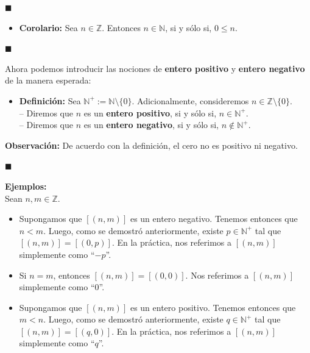 \documentclass[10 pt]{article}
\begin{document}
\begin{flushright}
    $\blacksquare$
\end{flushright}

\begin{itemize}
    \item \Large{\textbf{Corolario:} Sea $n \in \mathbb Z$. Entonces $n \in \mathbb N$, si y sólo si, $0 \leq n$.} \\
\end{itemize}

\begin{flushright}
    $\blacksquare$
\end{flushright}

\Large{Ahora podemos introducir las nociones de \textbf{entero positivo} y \textbf{entero negativo} de la manera esperada:} \\

\begin{itemize}
    \item \Large{\textbf{Definición:} Sea $\mathbb N^+:=\mathbb N \setminus \{0\}$. Adicionalmente, consideremos $n \in \mathbb Z \setminus \{0\}$. \\

    -- Diremos que $n$ es un \textbf{entero positivo}, si y sólo si, $n \in \mathbb N^+$. \\

    -- Diremos que $n$ es un \textbf{entero negativo}, si y sólo si, $n \notin \mathbb N^+$.} \\
\end{itemize}

\Large{\textbf{Observación:} De acuerdo con la definición, el cero no es positivo ni negativo.} \\

\begin{flushright}
    $\blacksquare$
\end{flushright}

\Large{\textbf{Ejemplos:}} \\

\Large{Sean $n,m \in \mathbb Z$.} \\

\begin{itemize}
    \item \Large{Supongamos que $[(n,m)]$ es un entero negativo. Tenemos entonces que $n<m$. Luego, como se demostró anteriormente, existe $p \in \mathbb N^+$ tal que $[(n,m)]=[(0,p)]$. En la práctica, nos referimos a $[(n,m)]$ simplemente como ``$-p$''.} \\

    \item \Large{Si $n=m$, entonces $[(n,m)]=[(0,0)]$. Nos referimos a $[(n,m)]$ simplemente como ``$0$''.} \\ 

    \item \Large{Supongamos que $[(n,m)]$ es un entero positivo. Tenemos entonces que $m<n$. Luego, como se demostró anteriormente, existe $q \in \mathbb N^+$ tal que $[(n,m)]=[(q,0)]$. En la práctica, nos referimos a $[(n,m)]$ simplemente como ``$q$''.} \\
\end{itemize}
\end{document}
